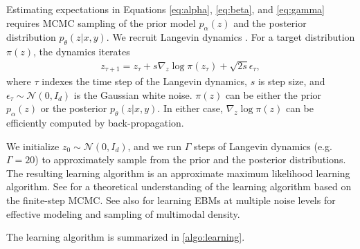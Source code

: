 \documentclass[accepted]{uai2023} %
\begin{document}
Estimating expectations in Equations \ref{eq:alpha}, \ref{eq:beta}, and \ref{eq:gamma} requires MCMC sampling of the prior model $p_\alpha(z)$ and the posterior distribution $p_\theta(z|x,y)$. We recruit Langevin dynamics \citep{neal2011mcmc,han2017abp}. For a target distribution $\pi(z)$, the dynamics iterates
\begin{align} 
z_{\tau+1} = z_\tau + s \nabla_z \log \pi(z_\tau) + \sqrt{2s} \epsilon_\tau, 
 \label{eq:Langevin}
\end{align}
where $\tau$ indexes the time step of the Langevin dynamics, $s$ is step size, and $\epsilon_\tau \sim {\mathcal N}(0, I_d)$ is the Gaussian white noise. $\pi(z)$ can be either the prior $p_\alpha(z)$ or the posterior $p_\theta(z|x, y)$. In either case, $\nabla_z \log \pi(z)$ can be efficiently computed by back-propagation. 

We initialize $z_0 \sim {\mathcal N}(0, I_d)$, and we run $\Gamma$ steps of Langevin dynamics (e.g. $\Gamma=20$) to approximately sample from the prior and the posterior distributions. The resulting learning algorithm is an approximate maximum likelihood learning algorithm. See \citep{pang2020learning,nijkamp2020learning2} for a theoretical understanding of the learning algorithm based on the finite-step MCMC. See also \citep{gao2020learning,yu2022latent} for learning EBMs at multiple noise levels for effective modeling and sampling of multimodal density. 

The learning algorithm is summarized in \cref{algo:learning}.
\end{document}
